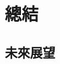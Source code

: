 \documentclass[class=NCU_thesis, crop=false]{standalone}
\begin{document}
\chapter{總結}

\section{未來展望}
\end{document}
